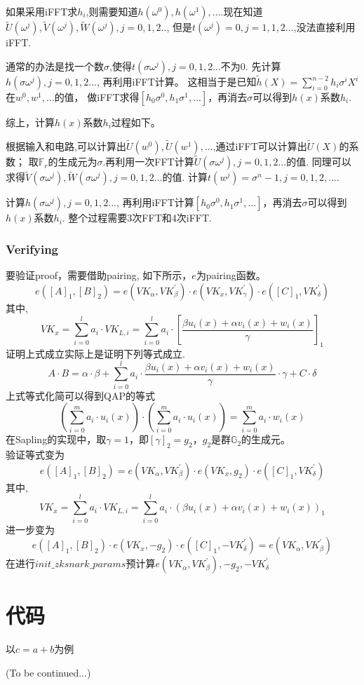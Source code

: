 \documentclass{article}
\renewcommand{\G}{\mathbb{G}}
\begin{document}
如果采用iFFT求$h_i$,则需要知道$h(\omega^0),h(\omega^1),...$.现在知道$\tilde{U}(\omega^j),\tilde{V}(\omega^j),
\tilde{W}(\omega^j),j=0,1,2..$, 但是$t(\omega^j)=0,j=1,1,2...$,没法直接利用iFFT.

通常的办法是找一个数$\sigma$,使得$t(\sigma\omega^j),j=0,1,2...$不为0.
先计算$h(\sigma\omega^j),j=0,1,2...$, 再利用iFFT计算。
这相当于是已知$\tilde{h}(X)=\sum_{i=0}^{n-2} h_i\sigma^i X^i$在$w^0,w^1,...$的值，
做iFFT求得$[h_0\sigma^0,h_1\sigma^1,...]$，再消去$\sigma$可以得到$h(x)$系数$h_i$.

综上，计算$h(x)$系数$h_i$过程如下。

根据输入和电路,可以计算出$\tilde{U}(w^0),\tilde{U}(w^1),...$,通过iFFT可以计算出$\tilde{U}(X)$的系数；
取$\mathbb{F}_r$的生成元为$\sigma$.再利用一次FFT计算$\tilde{U}(\sigma\omega^j),j=0,1,2...$的值.
同理可以求得$\tilde{V}(\sigma\omega^j),\tilde{W}(\sigma\omega^j),j=0,1,2...$的值.
计算$t(w^j)=\sigma^n-1,j=0,1,2,...$.

计算$h(\sigma\omega^j),j=0,1,2...$, 再利用iFFT计算$[h_0\sigma^0,h_1\sigma^1,...]$，再消去$\sigma$可以得到$h(x)$系数$h_i$.
整个过程需要3次FFT和4次iFFT.



\subsubsection{Verifying}
要验证proof，需要借助pairing, 如下所示，$e$为pairing函数。
$$
e([A]_1,[B]_2) = e(VK_\alpha,VK_\beta^{\prime})\cdot e(VK_x, VK_\gamma^{\prime})\cdot 
e([C]_1,VK_\delta^{\prime})
$$
其中,
$$VK_x = \sum_{i=0}^l a_i\cdot VK_{L,i} = \sum_{i=0}^l a_i\cdot 
[\frac{\beta u_i(x)+\alpha v_i(x)+w_i(x)}{\gamma}]_1$$
证明上式成立实际上是证明下列等式成立.
$$
A\cdot B=\alpha\cdot\beta + \sum_{i=0}^l a_i\cdot\frac{\beta u_i(x) + \alpha v_i(x) + w_i(x)}{\gamma} \cdot \gamma +
C\cdot\delta
$$
上式等式化简可以得到QAP的等式
$$(\sum_{i=0}^m a_i\cdot u_i(x))\cdot(\sum_{i=0}^m a_i\cdot u_i(x))=\sum_{i=0}^m a_i\cdot w_i(x)$$
在Sapling的实现中，取$\gamma=1$，即$[\gamma]_2 = g_2$，$g_2$是群$\G_2$的生成元。\\
验证等式变为
$$
e([A]_1,[B]_2) = e(VK_\alpha,VK_\beta^{\prime})\cdot e(VK_x, g_2)\cdot 
e([C]_1,VK_\delta^{\prime})
$$
其中,
$$VK_x = \sum_{i=0}^l a_i\cdot VK_{L,i} = \sum_{i=0}^l a_i\cdot 
(\beta u_i(x)+\alpha v_i(x)+w_i(x))_1$$
进一步变为
$$
e([A]_1,[B]_2) \cdot e(VK_x, -g_2)\cdot e([C]_1,-VK_\delta^{\prime}) = e(VK_\alpha,VK_\beta^{\prime}) 
$$
在进行$init\_zksnark\_params$预计算$e(VK_\alpha,VK_\beta^{\prime}),-g_2,-VK_\delta^{\prime}$
\section{代码}
以$c = a + b$为例


(To be continued...)
\end{document}

